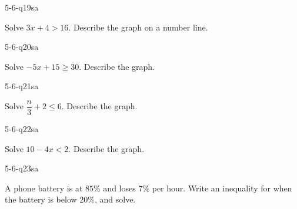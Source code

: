 \begin{practiceQuestion}{5-6-q19}{sa}
\begin{questionText}
Solve $3x + 4 > 16$. Describe the graph on a number line.
\end{questionText}
\end{practiceQuestion}

\begin{practiceQuestion}{5-6-q20}{sa}
\begin{questionText}
Solve $-5x + 15 \geq 30$. Describe the graph.
\end{questionText}
\end{practiceQuestion}

\begin{practiceQuestion}{5-6-q21}{sa}
\begin{questionText}
Solve $\dfrac{n}{3} + 2 \leq 6$. Describe the graph.
\end{questionText}
\end{practiceQuestion}

\begin{practiceQuestion}{5-6-q22}{sa}
\begin{questionText}
Solve $10 - 4x < 2$. Describe the graph.
\end{questionText}
\end{practiceQuestion}

\begin{practiceQuestion}{5-6-q23}{sa}
\begin{questionText}
A phone battery is at $85\%$ and loses $7\%$ per hour. Write an inequality for when the battery is below $20\%$, and solve.
\end{questionText}
\end{practiceQuestion}

